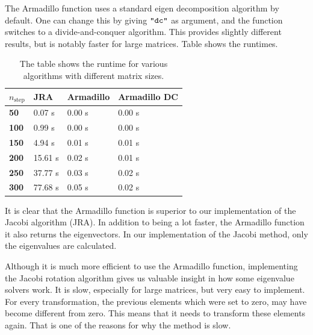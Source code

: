 The Armadillo function uses a standard eigen decomposition algorithm by default. One
can change this by giving $\verb|"dc"|$ as argument, and the function switches to a
divide-and-conquer algorithm. This provides slightly different results, but is notably
faster for large matrices. Table  shows the runtimes.
%
\begin{table}[htpb]
	\centering
	\begin{tabular}{|p{1cm}|p{1.5cm}|p{2cm}|p{2.5cm}|}
		\hline
		$n_{\mathrm{step}}$ & \textbf{JRA} & \textbf{Armadillo} & \textbf{Armadillo DC} \\
		\hline
		\hline
		\textbf{50} &  0.07 s & 0.00 s & 0.00 s \\
		\textbf{100} &  0.99 s & 0.00 s & 0.00 s \\
		\textbf{150} &  4.94 s & 0.01 s & 0.01 s \\
		\textbf{200} & 15.61 s & 0.02 s & 0.01 s \\
		\textbf{250} & 37.77 s & 0.03 s & 0.02 s \\
		\textbf{300} & 77.68 s & 0.05 s & 0.02 s \\
		\hline
	\end{tabular}
	\caption{The table shows the runtime for various algorithms with different matrix
	sizes.}
	\label{tab:runtime}
\end{table}
%
It is clear that the Armadillo function is superior to our implementation of the Jacobi
algorithm (JRA). In addition to being a lot faster, the Armadillo function it also returns
the eigenvectors. In our implementation of the Jacobi method, only the eigenvalues are
calculated.

Although it is much more efficient to use the Armadillo function, implementing the Jacobi
rotation algorithm gives us valuable insight in how some eigenvalue solvers work. It is
slow, especially for large matrices, but very easy to implement. For every transformation,
the previous elements which were set to zero, may have become different from zero. This
means that it needs to transform these elements again. That is one of the reasons for why 
the method is slow.


